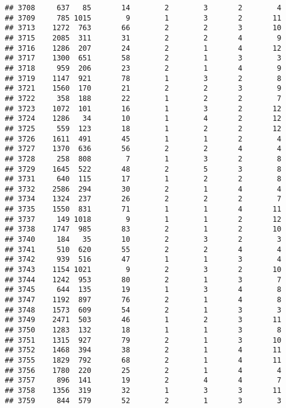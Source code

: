 \documentclass[]{article}
\begin{document}
\begin{verbatim}
## 3708     637   85       14        2        3       2        4
## 3709     785 1015        9        1        3       2       11
## 3713    1272  763       66        2        2       3       10
## 3715    2085  311       31        2        2       4        9
## 3716    1286  207       24        2        1       4       12
## 3717    1300  651       58        2        1       3        3
## 3718     959  206       23        2        1       4        9
## 3719    1147  921       78        1        3       2        8
## 3721    1560  170       21        2        2       3        9
## 3722     358  188       22        1        2       2        7
## 3723    1072  101       16        1        3       2       12
## 3724    1286   34       10        1        4       2       12
## 3725     559  123       18        1        2       2       12
## 3726    1611  491       45        1        1       2        4
## 3727    1370  636       56        2        2       4        4
## 3728     258  808        7        1        3       2        8
## 3729    1645  522       48        2        5       3        8
## 3731     640  115       17        1        2       2        8
## 3732    2586  294       30        2        1       4        4
## 3734    1324  237       26        2        2       2        7
## 3735    1550  831       71        1        1       4       11
## 3737     149 1018        9        1        1       2       12
## 3738    1747  985       83        2        1       2       10
## 3740     184   35       10        2        3       2        3
## 3741     510  620       55        2        2       4        4
## 3742     939  516       47        1        1       3        4
## 3743    1154 1021        9        2        3       2       10
## 3744    1242  953       80        2        1       3        7
## 3745     644  135       19        1        3       4        8
## 3747    1192  897       76        2        1       4        8
## 3748    1573  609       54        2        1       3        3
## 3749    2471  503       46        1        2       3       11
## 3750    1283  132       18        1        1       3        8
## 3751    1315  927       79        2        1       3       10
## 3752    1468  394       38        2        1       4       11
## 3755    1829  792       68        2        1       4       11
## 3756    1780  220       25        2        1       4        4
## 3757     896  141       19        2        4       4        7
## 3758    1356  319       32        1        3       3       11
## 3759     844  579       52        2        1       3        3

\end{verbatim}
\end{document}
